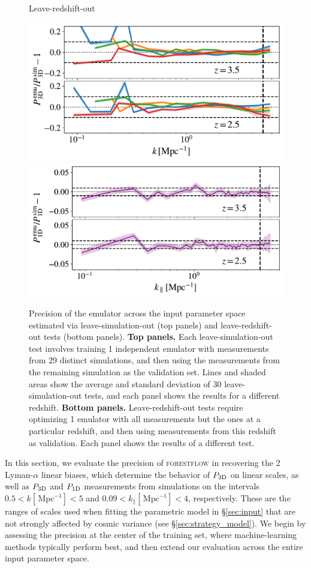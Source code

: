 \documentclass[fleqn,usenatbib]{mnras}
\newcommand{\poned}{\ensuremath{P_{\rm 1D}}\xspace}
\newcommand{\pthreed}{\ensuremath{P_{\rm 3D}}\xspace}
\newcommand{\forestflow}{\textsc{forestflow}\xspace}
\newcommand{\iMpc}{\ensuremath{\,\mathrm{Mpc}^{-1}}}
\begin{document}
\begin{figure}
\Large{Leave-redshift-out}\par\medskip
\includegraphics[width= 0.95\columnwidth]{figures/l1O_z_P3D.pdf}
\includegraphics[width= 0.96\columnwidth]{figures/l1O_z_P1D.pdf}
\caption{Precision of the emulator across the input parameter space estimated via leave-simulation-out (top panels) and leave-redshift-out tests (bottom panels). {\bf Top panels.} Each leave-simulation-out test involves training 1 independent emulator with measurements from 29 distinct simulations, and then using the measurements from the remaining simulation as the validation set. Lines and shaded areas show the average and standard deviation of 30 leave-simulation-out tests, and each panel shows the results for a different redshift. {\bf Bottom panels.} Leave-redshift-out tests require optimizing 1 emulator with all measurements but the ones at a particular redshift, and then using measurements from this redshift as validation. Each panel shows the results of a different test.
}
\label{fig:leave_sim_out}
\end{figure}

In this section, we evaluate the precision of \forestflow in recovering the 2 Lyman-$\alpha$ linear biases, which determine the behavior of \pthreed on linear scales, as well as \pthreed and \poned measurements from simulations on the intervals $0.5<k[\iMpc]<5$ and $0.09<k_\parallel[\iMpc]<4$, respectively. These are the ranges of scales used when fitting the parametric model in \S\ref{sec:input} that are not strongly affected by cosmic variance (see \S\ref{sec:strategy_model}). We begin by assessing the precision at the center of the training set, where machine-learning methods typically perform best, and then extend our evaluation across the entire input parameter space.
\end{document}
